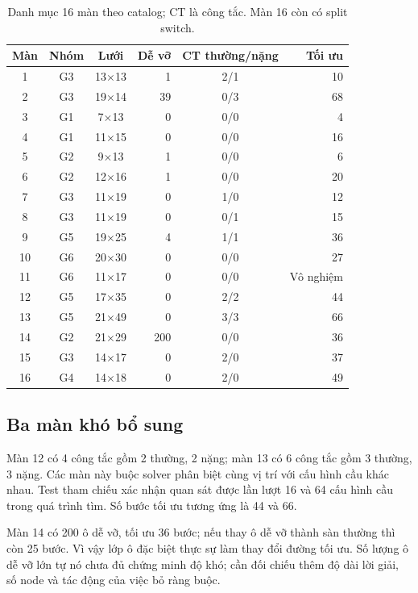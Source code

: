 \documentclass[a4paper]{article}
\begin{document}
\begin{table}[H]\centering\small
\renewcommand{\arraystretch}{1.12}
\begin{tabular}{@{}cccrcr@{}}\toprule
\textbf{Màn} & \textbf{Nhóm} & \textbf{Lưới} & \textbf{Dễ vỡ} & \textbf{CT thường/nặng} & \textbf{Tối ưu}\\\midrule
1 & G3 & 13$\times$13 & 1 & 2/1 & 10\\
2 & G3 & 19$\times$14 & 39 & 0/3 & 68\\
3 & G1 & 7$\times$13 & 0 & 0/0 & 4\\
4 & G1 & 11$\times$15 & 0 & 0/0 & 16\\
5 & G2 & 9$\times$13 & 1 & 0/0 & 6\\
6 & G2 & 12$\times$16 & 1 & 0/0 & 20\\
7 & G3 & 11$\times$19 & 0 & 1/0 & 12\\
8 & G3 & 11$\times$19 & 0 & 0/1 & 15\\
9 & G5 & 19$\times$25 & 4 & 1/1 & 36\\
10 & G6 & 20$\times$30 & 0 & 0/0 & 27\\
11 & G6 & 11$\times$17 & 0 & 0/0 & Vô nghiệm\\
12 & G5 & 17$\times$35 & 0 & 2/2 & 44\\
13 & G5 & 21$\times$49 & 0 & 3/3 & 66\\
14 & G2 & 21$\times$29 & 200 & 0/0 & 36\\
15 & G3 & 14$\times$17 & 0 & 2/0 & 37\\
16 & G4 & 14$\times$18 & 0 & 2/0 & 49\\
\bottomrule\end{tabular}
\caption[Danh mục 16 màn theo catalog]{Danh mục 16 màn theo catalog; CT là công tắc. Màn 16 còn có split switch.}
\end{table}

\subsection{Ba màn khó bổ sung}
Màn 12 có 4 công tắc gồm 2 thường, 2 nặng; màn 13 có 6 công tắc gồm 3 thường, 3 nặng. Các màn này buộc solver phân biệt cùng vị trí với cấu hình cầu khác nhau. Test tham chiếu xác nhận quan sát được lần lượt 16 và 64 cấu hình cầu trong quá trình tìm. Số bước tối ưu tương ứng là 44 và 66.

Màn 14 có 200 ô dễ vỡ, tối ưu 36 bước; nếu thay ô dễ vỡ thành sàn thường thì còn 25 bước. Vì vậy lớp ô đặc biệt thực sự làm thay đổi đường tối ưu. Số lượng ô dễ vỡ lớn tự nó chưa đủ chứng minh độ khó; cần đối chiếu thêm độ dài lời giải, số node và tác động của việc bỏ ràng buộc.
\end{document}
